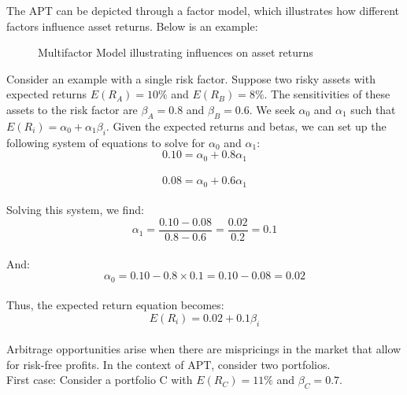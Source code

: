 \documentclass[a4paper,10pt]{article}
\begin{document}
\noindent The APT can be depicted through a factor model, which illustrates how different factors influence asset returns. Below is an example: \\

\begin{figure}[ht]
\centering
{}
\caption{Multifactor Model illustrating influences on asset returns}
\end{figure}

\noindent Consider an example with a single risk factor. Suppose two risky assets with expected returns \(E(R_A) = 10\%\) and \(E(R_B) = 8\%\). The sensitivities of these assets to the risk factor are \(\beta_A = 0.8\) and \(\beta_B = 0.6\). We seek \(\alpha_0\) and \(\alpha_1\) such that \(E(R_i) = \alpha_0 + \alpha_1 \beta_i\). Given the expected returns and betas, we can set up the following system of equations to solve for \(\alpha_0\) and \(\alpha_1\): \\
\[0.10 = \alpha_0 + 0.8\alpha_1\] \\
\[0.08 = \alpha_0 + 0.6\alpha_1\] \\

\noindent Solving this system, we find: \\
\[\alpha_1 = \frac{0.10 - 0.08}{0.8 - 0.6} = \frac{0.02}{0.2} = 0.1\] \\
\noindent And: \\
\[\alpha_0 = 0.10 - 0.8 \times 0.1 = 0.10 - 0.08 = 0.02\] \\
\noindent Thus, the expected return equation becomes: \\
\[E(R_i) = 0.02 + 0.1 \beta_i\] \\

\noindent Arbitrage opportunities arise when there are mispricings in the market that allow for risk-free profits. In the context of APT, consider two portfolios. \\

\noindent First case: Consider a portfolio C with \(E(R_C) = 11\%\) and \(\beta_C = 0.7\). \\
\end{document}
